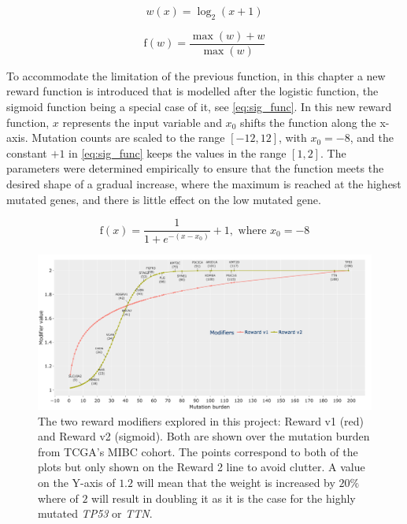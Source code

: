 \begin{equation} \label{eq:n_II:w}
    w(x) = \log_2(x+1)
\end{equation}

\begin{equation} \label{eq:n_II:norm3_func}
\text{f}(w) = \frac{\max(w) + w}{\max(w)}
\end{equation}

To accommodate the limitation of the previous function, in this chapter a new reward function is introduced that is modelled after the logistic function, the sigmoid function being a special case of it, see \cref{eq:sig_func}. In this new reward function, $x$ represents the input variable and $x_0$ shifts the function along the x-axis. Mutation counts are scaled to the range $[-12, 12]$, with $x_0 = -8$, and the constant $+1$ in \cref{eq:sig_func} keeps the values in the range $[1, 2]$. The parameters were determined empirically to ensure that the function meets the desired shape of a gradual increase, where the maximum is reached at the highest mutated genes, and there is little effect on the low mutated gene.

\begin{equation} \label{eq:sig_func}
\text{f}(x) =  \frac{1}{1 + e^{-(x - x_0)}} + 1, \text{ where } x_0=-8
\end{equation}


\begin{figure}[!b]    
    \centering
    \includegraphics[width=1.0\textwidth,height=1.0\textheight,keepaspectratio]{Sections/Network_II/validation/reward_modifiers.png}
    \caption[Influences of edges weight by Reward v1 and v2 modifiers ]{The two reward modifiers explored in this project: Reward v1 (red) and Reward v2 (sigmoid). Both are shown over the mutation burden from TCGA's MIBC cohort. The points correspond to both of the plots but only shown on the Reward 2 line to avoid clutter. A value on the Y-axis of $1.2$ will mean that the weight is increased by $20\%$ where of $2$ will result in doubling it as it is the case for the highly mutated \textit{TP53} or \textit{TTN}. }
    \label{fig:N_II:modifiers_comp}
\end{figure}



